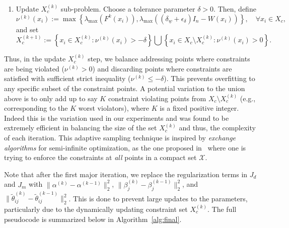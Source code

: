 \documentclass[conference]{svproc}
\newcommand{\X}{\mathcal{X}}
\newcommand{\wl}{\underline{w}}
\newcommand{\xs}{x_i}
\begin{document}
\begin{leftbox}
\begin{enumerate}
\item Update $X_c^{(k)}$ sub-problem. Choose a tolerance parameter $\delta>0$. Then, define
    \[
        \nu^{(k)}(\xs) := \max \left\{ \lambda_{\max} \left(F^k(\xs)\right) , \lambda_{\max} \left((\delta_{\wl}+\epsilon_{\delta})I_n - W(\xs) \right) \right \}, \quad \forall \xs \in X_c,
    \]
    and set
    \begin{equation}
        X_{c}^{(k+1)} :=  \left\{ \xs \in X_c^{(k)} : \nu^{(k)}(\xs) > -\delta \right\} \bigcup  \left\{\xs \in X_c \setminus X_c^{(k)} : \nu^{(k)}(\xs) > 0 \right\}. 
        \label{Xc_up}
    \end{equation}
\end{enumerate}
\end{leftbox}
Thus, in the update $X_c^{(k)}$ step, we balance addressing points where constraints are being violated ($\nu^{(k)} > 0$) and discarding points where constraints are satisfied with sufficient strict inequality ($\nu^{(k)}\leq -\delta$). This prevents overfitting to any specific subset of the constraint points. A potential variation to the union above is to only add up to say $K$ constraint violating points from $X_c\setminus X_c^{(k)}$ (e.g., corresponding to the $K$ worst violators), where $K$ is a fixed positive integer. Indeed this is the variation used in our experiments and was found to be extremely efficient in balancing the size of the set $X_c^{(k)}$ and thus, the complexity of each iteration. This adaptive sampling technique is inspired by \emph{exchange algorithms} for semi-infinite optimization, as the one proposed in~\cite{ZhangWuEtAl2010} where one is trying to enforce the constraints at \emph{all} points in a compact set $\X$.

Note that after the first major iteration, we replace the regularization terms in $J_d$ and $J_m$ with $\|\alpha^{(k)} - \alpha^{(k-1)}\|_2^2$, $\|\beta_j^{(k)}-\beta_j^{(k-1)}\|_2^2$, and $\|\tilde{\theta}_{ij}^{(k)} - \tilde{\theta}_{ij}^{(k-1)}\|_2^2$. This is done to prevent large updates to the parameters, particularly due to the dynamically updating constraint set $X_c^{(k)}$. The full pseudocode is summarized below in Algorithm~\ref{alg:final}. 
\end{document}
